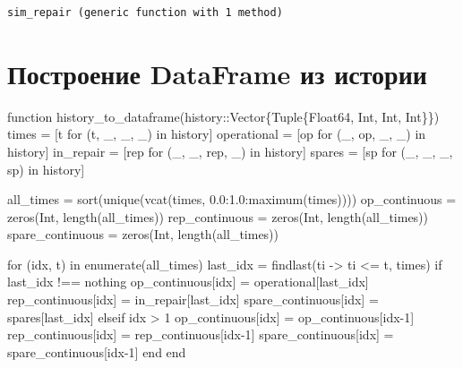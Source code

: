 \documentclass[
  12pt,
  a4paper,
  DIV=11,
  numbers=noendperiod]{scrreprt}
\newenvironment{Shaded}{\begin{snugshade}}{\end{snugshade}}
\newcommand{\ConstantTok}[1]{\textcolor[rgb]{0.56,0.35,0.01}{#1}}
\newcommand{\ControlFlowTok}[1]{\textcolor[rgb]{0.00,0.23,0.31}{#1}}
\newcommand{\DataTypeTok}[1]{\textcolor[rgb]{0.68,0.00,0.00}{#1}}
\newcommand{\FloatTok}[1]{\textcolor[rgb]{0.68,0.00,0.00}{#1}}
\newcommand{\FunctionTok}[1]{\textcolor[rgb]{0.28,0.35,0.67}{#1}}
\newcommand{\KeywordTok}[1]{\textcolor[rgb]{0.00,0.23,0.31}{#1}}
\newcommand{\NormalTok}[1]{\textcolor[rgb]{0.00,0.23,0.31}{#1}}
\newcommand{\OperatorTok}[1]{\textcolor[rgb]{0.37,0.37,0.37}{#1}}
\begin{document}
\begin{verbatim}
sim_repair (generic function with 1 method)
\end{verbatim}

\section{Построение DataFrame из
истории}\label{ux43fux43eux441ux442ux440ux43eux435ux43dux438ux435-dataframe-ux438ux437-ux438ux441ux442ux43eux440ux438ux438}

\begin{Shaded}
\begin{Highlighting}[]
\KeywordTok{function} \FunctionTok{history\_to\_dataframe}\NormalTok{(history}\OperatorTok{::}\DataTypeTok{Vector\{Tuple\{Float64, Int, Int, Int\}\}}\NormalTok{)}
\NormalTok{    times }\OperatorTok{=}\NormalTok{ [t for (t, \_, \_, \_) }\KeywordTok{in}\NormalTok{ history]}
\NormalTok{    operational }\OperatorTok{=}\NormalTok{ [op for (\_, op, \_, \_) }\KeywordTok{in}\NormalTok{ history]}
\NormalTok{    in\_repair }\OperatorTok{=}\NormalTok{ [rep for (\_, \_, rep, \_) }\KeywordTok{in}\NormalTok{ history]}
\NormalTok{    spares }\OperatorTok{=}\NormalTok{ [sp for (\_, \_, \_, sp) }\KeywordTok{in}\NormalTok{ history]}

\NormalTok{    all\_times }\OperatorTok{=} \FunctionTok{sort}\NormalTok{(}\FunctionTok{unique}\NormalTok{(}\FunctionTok{vcat}\NormalTok{(times, }\FloatTok{0.0}\OperatorTok{:}\FloatTok{1.0}\OperatorTok{:}\FunctionTok{maximum}\NormalTok{(times))))}
\NormalTok{    op\_continuous }\OperatorTok{=} \FunctionTok{zeros}\NormalTok{(}\DataTypeTok{Int}\NormalTok{, }\FunctionTok{length}\NormalTok{(all\_times))}
\NormalTok{    rep\_continuous }\OperatorTok{=} \FunctionTok{zeros}\NormalTok{(}\DataTypeTok{Int}\NormalTok{, }\FunctionTok{length}\NormalTok{(all\_times))}
\NormalTok{    spare\_continuous }\OperatorTok{=} \FunctionTok{zeros}\NormalTok{(}\DataTypeTok{Int}\NormalTok{, }\FunctionTok{length}\NormalTok{(all\_times))}

    \ControlFlowTok{for}\NormalTok{ (idx, t) }\KeywordTok{in} \FunctionTok{enumerate}\NormalTok{(all\_times)}
\NormalTok{        last\_idx }\OperatorTok{=} \FunctionTok{findlast}\NormalTok{(ti }\OperatorTok{{-}\textgreater{}}\NormalTok{ ti }\OperatorTok{\textless{}=}\NormalTok{ t, times)}
        \ControlFlowTok{if}\NormalTok{ last\_idx }\OperatorTok{!==} \ConstantTok{nothing}
\NormalTok{            op\_continuous[idx] }\OperatorTok{=}\NormalTok{ operational[last\_idx]}
\NormalTok{            rep\_continuous[idx] }\OperatorTok{=}\NormalTok{ in\_repair[last\_idx]}
\NormalTok{            spare\_continuous[idx] }\OperatorTok{=}\NormalTok{ spares[last\_idx]}
        \ControlFlowTok{elseif}\NormalTok{ idx }\OperatorTok{\textgreater{}} \FloatTok{1}
\NormalTok{            op\_continuous[idx] }\OperatorTok{=}\NormalTok{ op\_continuous[idx}\OperatorTok{{-}}\FloatTok{1}\NormalTok{]}
\NormalTok{            rep\_continuous[idx] }\OperatorTok{=}\NormalTok{ rep\_continuous[idx}\OperatorTok{{-}}\FloatTok{1}\NormalTok{]}
\NormalTok{            spare\_continuous[idx] }\OperatorTok{=}\NormalTok{ spare\_continuous[idx}\OperatorTok{{-}}\FloatTok{1}\NormalTok{]}
        \ControlFlowTok{end}
    \ControlFlowTok{end}


\end{Highlighting}
\end{Shaded}
\end{document}
